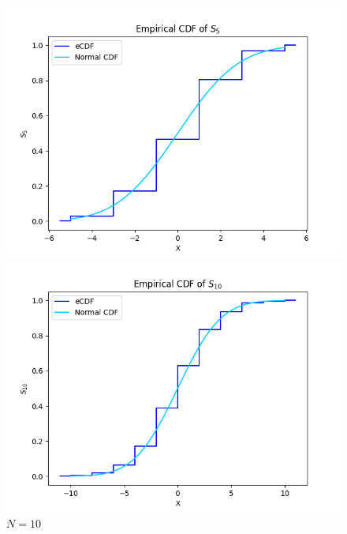 \documentclass{article}
\begin{document}
\begin{figure}[H]
    \centering
        \begin{minipage}{0.24\textwidth}
        \centering
        \includegraphics[width=\linewidth]{ex2/ex2_5.png}
        \caption{$N=5$}
    \end{minipage}
        \begin{minipage}{0.24\textwidth}
        \centering
        \includegraphics[width=\linewidth]{ex2/ex2_10.png}
        \caption{$N=10$}
    \end{minipage}
        \begin{minipage}{0.24\textwidth}
        \centering

\end{minipage}
\end{figure}
\end{document}
